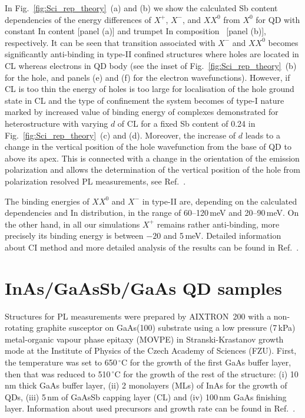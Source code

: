 In Fig.~\ref{fig:Sci_rep_theory}~(a) and (b) we show the calculated Sb content dependencies of the energy differences of $X^+$, $X^-$, and $XX^0$ from $X^0$ for QD with constant In content [panel (a)] and trumpet In composition~\cite{Migliorato} [panel (b)], respectively. It can be seen that transition associated with $X^-$ and $XX^0$ becomes significantly anti-binding in type-II confined structures where holes are located in CL whereas electrons in QD body (see the inset of Fig.~\ref{fig:Sci_rep_theory}~(b) for the hole, and panels (e) and (f) for the electron wavefunctions). However, if CL is too thin the energy of holes is too large for localisation of the hole ground state in CL and the type of confinement the system becomes of type-I nature marked by increased value of binding energy of complexes demonstrated for heterostructure with varying $d$ of CL for a fixed Sb content of 0.24 in Fig.~\ref{fig:Sci_rep_theory}~(c) and (d). Moreover, the increase of $d$ leads to a change in the vertical position of the hole wavefunction from the base of QD to above its apex. This is connected with a change in the orientation of the emission polarization and allows the determination of the vertical position of the hole from polarization resolved PL measurements, see Ref.~\citep{Klenovsky2016}. 

The binding energies of $XX^0$ and $X^-$ in type-II are, depending on the calculated dependencies and In distribution, in the range of 60--120$\,$meV and 20--90$\,$meV. On the other hand, in all our simulations $X^+$ remains rather anti-binding, more precisely its binding energy is between $-20$ and 5$\,$meV. Detailed information about CI method and more detailed analysis of the results can be found in Ref.~\citep{Klenovsky2017}.


\section{InAs/GaAsSb/GaAs QD samples}

Structures for PL measurements were prepared by AIXTRON~200 with a non-rotating graphite susceptor on GaAs(100) substrate using a low pressure (7$\,$kPa) metal-organic vapour phase epitaxy (MOVPE) in Stranski-Krastanov growth mode at the Institute of Physics of the Czech Academy of Sciences (FZU). First, the temperature was set to 650$\,$$^\circ$C for the growth of the first GaAs buffer layer, then that was reduced to 510$\,$$^\circ$C for the growth of the rest of the structure: (i) 10$\,$nm thick GaAs buffer layer, (ii) 2 monolayers (MLs) of InAs for the growth of QDs, (iii) 5$\,$nm of GaAsSb capping layer (CL) and (iv) 100$\,$nm GaAs finishing layer. Information about used precursors and growth rate can be found in Ref.~\citep{Klenovsky2016}.

